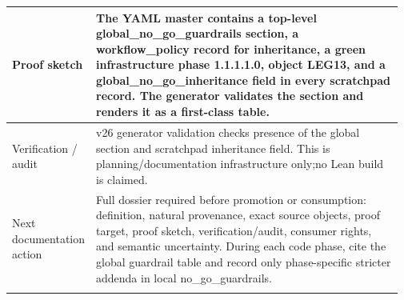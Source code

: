 \begin{longtable}{L{0.16\linewidth} L{0.81\linewidth}}
\hline\addlinespace[0.20em]
Proof sketch & The YAML master contains a top-level global\_no\_go\_guardrails section, a workflow\_policy record for inheritance, a green infrastructure phase 1.1.1.1.0, object LEG13, and a global\_no\_go\_inheritance field in every scratchpad record. The generator validates the section and renders it as a first-class table.\\
\hline\addlinespace[0.20em]
Verification /\allowbreak{} audit & v26 generator validation checks presence of the global section and scratchpad inheritance field. This is planning/\allowbreak{}documentation infrastructure only;\newline no Lean build is claimed.\\
\hline\addlinespace[0.20em]
Next documentation action & Full dossier required before promotion or consumption: definition, natural provenance, exact source objects, proof target, proof sketch, verification/\allowbreak{}audit, consumer rights, and semantic uncertainty. During each code phase, cite the global guardrail table and record only phase-specific stricter addenda in local no\_go\_guardrails.\\
\hline\addlinespace[0.20em]
\end{longtable}
